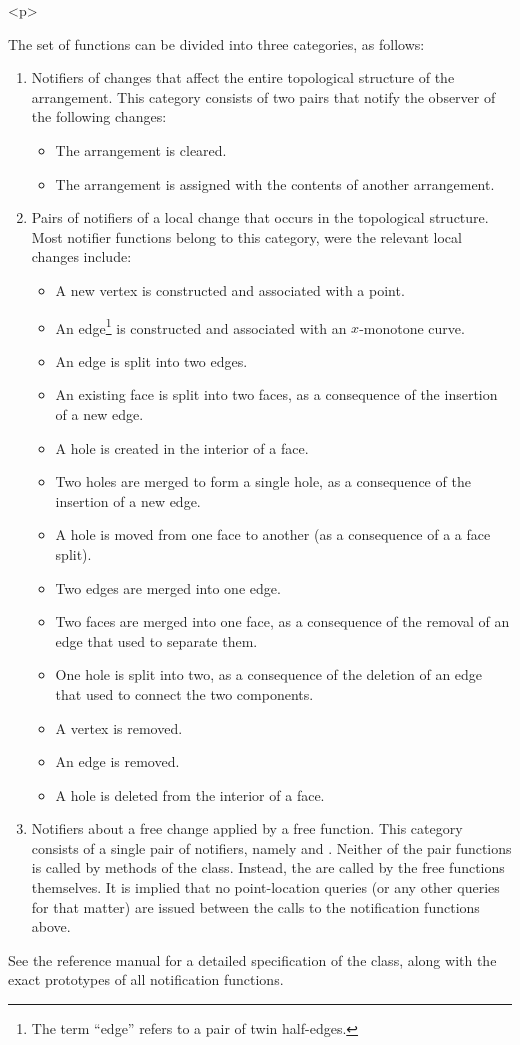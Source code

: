 \begin{ccHtmlOnly}<p>\end{ccHtmlOnly}
The set of functions can be divided into three categories, as
follows:
\begin{enumerate}
\item Notifiers of changes that affect the entire topological structure
of the arrangement. This category consists of two pairs that
notify the observer of the following changes:
\begin{itemize}
\item The arrangement is cleared.
\item The arrangement is assigned with the contents of another
arrangement.
\end{itemize}
\item Pairs of notifiers of a local change that occurs in the
topological structure. Most notifier functions belong to this
category, were the relevant local changes include:
\begin{itemize}
\item A new vertex is constructed and associated with a point.
\item An edge\footnote{The term ``edge'' refers to a pair of twin
half-edges.} is constructed and associated with an $x$-monotone
curve.
\item An edge is split into two edges.
\item An existing face is split into two faces, as a consequence of the
insertion of a new edge.
\item A hole is created in the interior of a face.
\item Two holes are merged to form a single hole, as a consequence of the
insertion of a new edge.
\item A hole is moved from one face to another (as a consequence of a
a face split).
\item Two edges are merged into one edge.
\item Two faces are merged into one face, as a consequence of the
removal of an edge that used to separate them.
\item One hole is split into two, as a consequence of the deletion of an 
edge that used to connect the two components.
\item A vertex is removed.
\item An edge is removed.
\item A hole is deleted from the interior of a face.
\end{itemize}
\item Notifiers about a free change applied by a free function.
This category consists of a single pair of notifiers, namely
 and . Neither of
the pair functions is called by methods of the  class. 
Instead, the are called by the free functions themselves. It is implied 
that no point-location queries (or any other queries for that matter)
are issued between the calls to the notification functions above.
\end{enumerate}
See the reference manual for a detailed specification of the
 class, along with the exact prototypes of all
notification functions.

